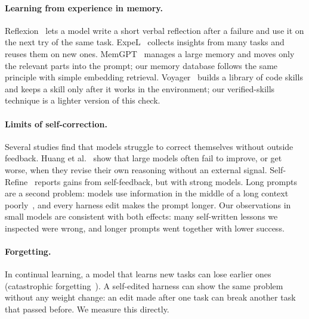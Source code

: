 \paragraph{Learning from experience in memory.}
Reflexion~\cite{shinn2023reflexion} lets a model write a short verbal reflection after a failure
and use it on the next try of the same task. ExpeL~\cite{zhao2024expel} collects insights from many
tasks and reuses them on new ones. MemGPT~\cite{packer2023memgpt} manages a large memory and moves
only the relevant parts into the prompt; our memory database follows the same principle with
simple embedding retrieval. Voyager~\cite{wang2023voyager} builds a library of code skills and
keeps a skill only after it works in the environment; our verified-skills technique is a lighter
version of this check.

\paragraph{Limits of self-correction.}
Several studies find that models struggle to correct themselves without outside feedback.
Huang et al.~\cite{huang2024cannot} show that large models often fail to improve, or get worse,
when they revise their own reasoning without an external signal. Self-Refine~\cite{madaan2023selfrefine}
reports gains from self-feedback, but with strong models. Long prompts are a second problem: models
use information in the middle of a long context poorly~\cite{liu2024lost}, and every harness edit
makes the prompt longer. Our observations in small models are consistent with both effects: many
self-written lessons we inspected were wrong, and longer prompts went together with lower success.

\paragraph{Forgetting.}
In continual learning, a model that learns new tasks can lose earlier ones (catastrophic
forgetting~\cite{mccloskey1989catastrophic,kirkpatrick2017overcoming}). A self-edited harness can
show the same problem without any weight change: an edit made after one task can break another task
that passed before. We measure this directly.
